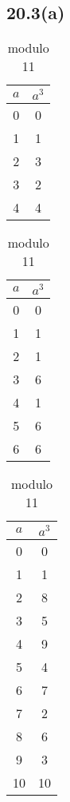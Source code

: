 \subsection{20.3(a)}

\begin{table}[H]
\centering
\begin{subtable}[b]{.24\linewidth}
	\centering
	\begin{tabular}{c|c}
		$a$ & $a^3$ \\ \hline
		0 & 0 \\
		1 & 1 \\
		2 & 3 \\
		3 & 2 \\
		4 & 4
	\end{tabular}
	\caption*{modulo 5}
\end{subtable}
\begin{subtable}[b]{.24\linewidth}
	\centering
	\begin{tabular}{c|c}
		$a$ & $a^3$ \\ \hline
		0 & 0 \\
		1 & 1 \\
		2 & 1 \\
		3 & 6 \\
		4 & 1 \\
		5 & 6 \\
		6 & 6
	\end{tabular}
	\caption*{modulo 7}
\end{subtable}
\begin{subtable}[b]{.24\linewidth}
	\centering
	\begin{tabular}{c|c}
		$a$ & $a^3$ \\ \hline
		0 & 0 \\
		1 & 1 \\
		2 & 8 \\
		3 & 5 \\
		4 & 9 \\
		5 & 4 \\
		6 & 7 \\
		7 & 2 \\
		8 & 6 \\
		9 & 3 \\
		10 & 10
	\end{tabular}
	\caption*{modulo 11}
\end{subtable}
\begin{subtable}[b]{.24\linewidth}

\end{subtable}
\end{table}
